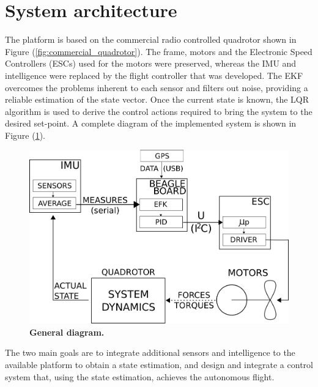 \documentclass[conference]{IEEEtran}
\newcommand{\refp}[1]{(\ref{#1})}
\begin{document}
\section{System architecture}
The platform is based on the commercial radio controlled quadrotor shown in Figure \refp{fig:commercial_quadrotor}. The frame, motors and the Electronic Speed Controllers (ESCs) used for the motors were preserved, whereas the IMU and intelligence were replaced by the flight controller that was developed. The EKF overcomes the problems inherent to each sensor and filters out noise, providing a reliable estimation of the state vector. Once the current state is known, the LQR algorithm is used to derive the control actions required to bring the system to the desired set-point. A complete diagram of the implemented system is shown in Figure \refp{fig:diagrama_tio}.
\begin{figure}
\vspace{-.5cm}
	\centering
	\includegraphics[width=.7\columnwidth]{./pics_paper/diagrama_general.png}
	\caption{\textbf{General diagram.}}
	\label{fig:diagrama_tio}
	\vspace{-.5cm}
\end{figure}
The two main goals are to integrate additional sensors and intelligence to the available platform to obtain a state estimation, and design and integrate a control system that, using the state estimation, achieves the autonomous flight.
\end{document}
